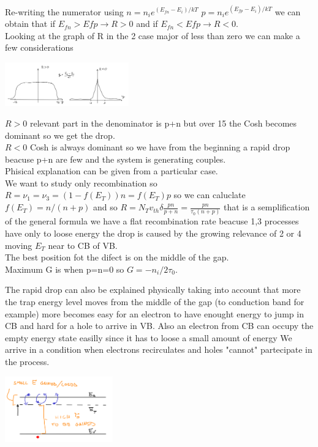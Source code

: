 Re-writing the numerator using $n=n_ie^{(E_{fn}-E_i)/kT}$ $p=n_ie^{(E_{fp}-E_i)/kT}$ we can obtain that if $E_{fn}>E{fp}\rightarrow R>0$ and if $E_{fn}<E{fp}\rightarrow R<0$.\\
\vspace{5mm}
Looking at the graph of R in the 2 case major of less than zero we can make a few considerations

\centering
\includegraphics[width=0.4\textwidth]{RG.png}\\
\raggedright

\tab $R>0$ relevant part in the denominator is p+n but over 15 the Cosh becomes dominant so we get the drop.\\
\tab $R<0$ Cosh is always dominant so we have from the beginning a rapid drop beacuse p+n are few and the system is generating couples.\\
\vspace{5mm}
Phisical explanation can be given from a particular case.\\
We want to study only recombination so $R=\nu_1=\nu_3=(1-f(E_T))n=f(E_T)p$ so we can caluclate $f(E_T)=n/(n+p)$ and so $R=N_Tv_{th}\delta \frac{pn}{p+n}=\frac{pn}{\tau_0(n+p)}$ that is a semplification of the general formula we have a flat recombination rate beacuse 1,3 processes have only to loose energy the drop is caused by the growing relevance of 2 or 4 moving $E_T$ near to CB of VB.\\
The best position fot the difect is on the middle of the gap.\\
Maximum G is when p=n=0 so $G=-n_i/2\tau_0$.\\

\vspace{5mm}

The rapid drop can also be explained physically taking into account that more the trap energy level moves from the middle of the gap (to conduction band for example) more becomes easy for an electron to have enought energy to jump in CB and hard for a hole to arrive in VB. Also an electron from CB can occupy the empty energy state easilly since it has to loose a small amount of energy 
We arrive in a condition when electrons recirculates and holes "cannot" partecipate in the process.


\centering
\includegraphics[width=0.35\textwidth]{Grate.png}\\
\raggedright


